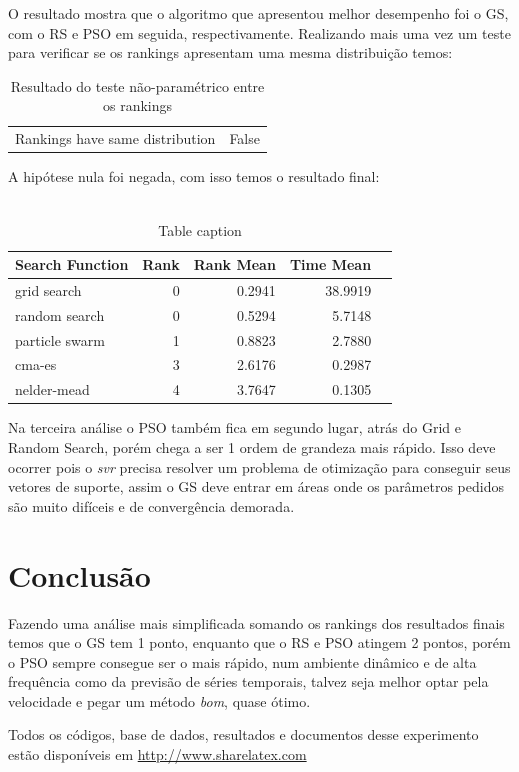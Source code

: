 \documentclass[preprint,12pt]{elsarticle}
\begin{document}
O resultado mostra que o algoritmo que apresentou melhor desempenho foi o GS, com o RS e PSO em seguida, respectivamente. Realizando mais uma vez um teste para verificar se os rankings apresentam uma mesma distribuição temos:

\begin{table}[h]
	\centering
	\begin{tabular}{l r}
		
		Rankings have same distribution  &  False \\
		
	\end{tabular}
	\caption{Resultado do teste não-paramétrico entre os rankings}
\end{table}

A hipótese nula foi negada, com isso temos o resultado final:\\ \\

\begin{table}[h]
	\centering
	\begin{tabular}{lrrrr}
		\hline
		Search Function   &   Rank &   Rank Mean &     Time Mean \\
		\hline
		grid search       &      0 &    0.2941 &       38.9919   \\
		random search     &      0 &    0.5294 &         5.7148   \\
		particle swarm    &      1 &    0.8823 &         2.7880  \\
		cma-es            &      3 &    2.6176  &   0.2987 \\
		nelder-mead       &      4 &    3.7647  &        0.1305 \\
		\hline
	\end{tabular}
	
	
	\caption{Table caption}
\end{table}

Na terceira análise o PSO também fica em segundo lugar, atrás do Grid e Random Search, porém chega a ser 1 ordem de grandeza mais rápido. Isso deve ocorrer pois o \textit{svr} precisa resolver um problema de otimização para conseguir seus vetores de suporte, assim o GS deve entrar em áreas onde os parâmetros pedidos são muito difíceis e de convergência demorada.


\section{Conclusão}

Fazendo uma análise mais simplificada somando os rankings dos resultados finais temos que o GS tem 1 ponto, enquanto que o RS e PSO atingem 2 pontos, porém o PSO sempre consegue ser o mais rápido, num ambiente dinâmico e de alta frequência como da previsão de séries temporais, talvez seja melhor optar pela velocidade e pegar um método \textit{bom}, quase ótimo.

Todos os códigos, base de dados, resultados e documentos desse experimento estão disponíveis em \url{http://www.sharelatex.com}




\end{document}
